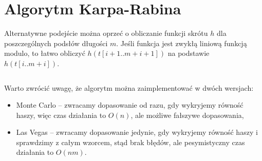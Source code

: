 \section{Algorytm Karpa-Rabina}

Alternatywne podejście można oprzeć o obliczanie funkcji skrótu $h$ dla poszczególnych podsłów długości $m$. Jeśli funkcja jest zwykłą liniową funkcją modulo, to łatwo obliczyć $h(t[i + 1..m + i + 1])$ na podstawie $h(t[i..m + i])$.

\begin{code}
\inputminted{python}{code/exact-string-matching/karp-rabin.py}
\label{alg:exact-string-matching-karp-rabin}
\end{code}

Warto zwrócić uwagę, że algorytm można zaimplementować w dwóch wersjach:
\begin{itemize}
    \item Monte Carlo -- zwracamy dopasowanie od razu, gdy wykryjemy równość haszy, więc czas działania to $O(n)$, ale możliwe fałszywe dopasowania,
    \item Las Vegas -- zwracamy dopasowanie jedynie, gdy wykryjemy równość haszy i sprawdzimy z całym wzorcem, stąd brak błędów, ale pesymistyczny czas działania to $O(n m)$.
\end{itemize}
